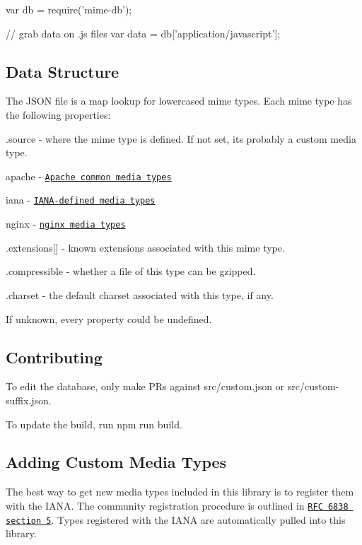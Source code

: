 \begin{DoxyCode}
var db = require('mime-db');

// grab data on .js files
var data = db['application/javascript'];
\end{DoxyCode}


\subsection*{Data Structure}

The J\+S\+ON file is a map lookup for lowercased mime types. Each mime type has the following properties\+:


\begin{DoxyItemize}
\item {\ttfamily .source} -\/ where the mime type is defined. If not set, it\textquotesingle{}s probably a custom media type.
\begin{DoxyItemize}
\item {\ttfamily apache} -\/ \href{http://svn.apache.org/repos/asf/httpd/httpd/trunk/docs/conf/mime.types}{\tt Apache common media types}
\item {\ttfamily iana} -\/ \href{http://www.iana.org/assignments/media-types/media-types.xhtml}{\tt I\+A\+N\+A-\/defined media types}
\item {\ttfamily nginx} -\/ \href{http://hg.nginx.org/nginx/raw-file/default/conf/mime.types}{\tt nginx media types}
\end{DoxyItemize}
\item {\ttfamily .extensions\mbox{[}\mbox{]}} -\/ known extensions associated with this mime type.
\item {\ttfamily .compressible} -\/ whether a file of this type can be gzipped.
\item {\ttfamily .charset} -\/ the default charset associated with this type, if any.
\end{DoxyItemize}

If unknown, every property could be {\ttfamily undefined}.

\subsection*{Contributing}

To edit the database, only make P\+Rs against {\ttfamily src/custom.\+json} or {\ttfamily src/custom-\/suffix.\+json}.

To update the build, run {\ttfamily npm run build}.

\subsection*{Adding Custom Media Types}

The best way to get new media types included in this library is to register them with the I\+A\+NA. The community registration procedure is outlined in \href{http://tools.ietf.org/html/rfc6838#section-5}{\tt R\+FC 6838 section 5}. Types registered with the I\+A\+NA are automatically pulled into this library. 